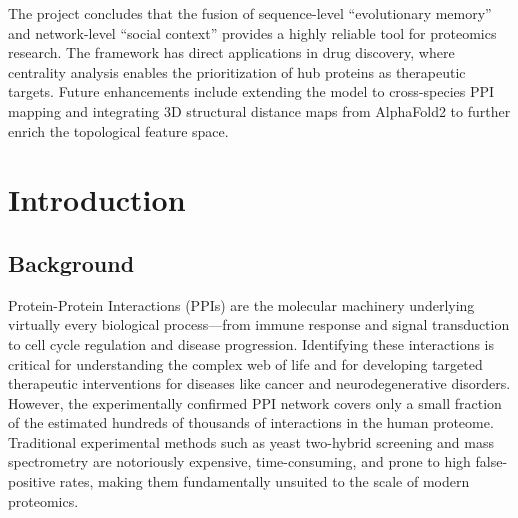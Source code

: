 \documentclass[12pt,a4paper]{report}
\begin{document}
{\par \vspace{0.15in}
\noindent The project concludes that the fusion of sequence-level ``evolutionary memory'' and network-level ``social context'' provides a highly reliable tool for proteomics research. The framework has direct applications in drug discovery, where centrality analysis enables the prioritization of hub proteins as therapeutic targets. Future enhancements include extending the model to cross-species PPI mapping and integrating 3D structural distance maps from AlphaFold2 to further enrich the topological feature space.
}

\newpage
\renewcommand{\contentsname}{Table of Contents}
\tableofcontents
\listoffigures
{}
\listoftables
{}
\newpage

\pagestyle{fancy}
\fancyhf{}
\renewcommand{\headrulewidth}{0.5pt}
\renewcommand{\footrulewidth}{0.5pt}

\linespread{0.89}
\justifying
{}
\chapter{Introduction}
\section{Background}
Protein-Protein Interactions (PPIs) are the molecular machinery underlying virtually every biological process---from immune response and signal transduction to cell cycle regulation and disease progression. Identifying these interactions is critical for understanding the complex web of life and for developing targeted therapeutic interventions for diseases like cancer and neurodegenerative disorders. However, the experimentally confirmed PPI network covers only a small fraction of the estimated hundreds of thousands of interactions in the human proteome. Traditional experimental methods such as yeast two-hybrid screening and mass spectrometry are notoriously expensive, time-consuming, and prone to high false-positive rates, making them fundamentally unsuited to the scale of modern proteomics.
\end{document}
